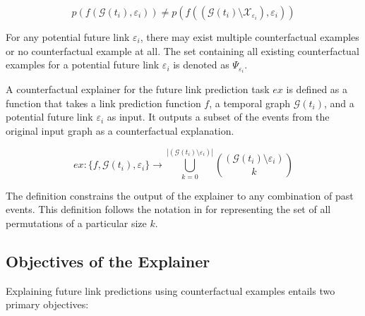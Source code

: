 \begin{equation}
    \label{e_CFExplanation}
    p(f(\mathcal{G}(t_i), \varepsilon_{i})) \neq p(f((\mathcal{G}(t_i) \setminus \mathcal{X}_{\varepsilon_i}), \varepsilon_{i}))
\end{equation}

For any potential future link $\varepsilon_{i}$, there may exist multiple counterfactual examples or no counterfactual example at all. The set containing all existing counterfactual examples for a potential future link $\varepsilon_{i}$ is denoted as $\Psi_{\varepsilon_i}$.

A counterfactual explainer for the future link prediction task $ex$ is defined as a function that takes a link prediction function $f$, a temporal graph $\mathcal{G}(t_i)$, and a potential future link $\varepsilon_i$ as input. It outputs a subset of the events from the original input graph as a counterfactual explanation.

\begin{equation}
    \label{e_Explainer}
    ex: \{f, \mathcal{G}(t_i), \varepsilon_i\} \rightarrow \bigcup_{k = 0}^{|(\mathcal{G}(t_i) \setminus \varepsilon_i)|} {(\mathcal{G}(t_i) \setminus \varepsilon_i) \choose k}
\end{equation}

The definition constrains the output of the explainer to any combination of past events. This definition follows the notation in \cite{stanley_enumerative_1986} for representing the set of all permutations of a particular size $k$.

\newpage

\subsection{Objectives of the Explainer}
\label{s_ProblemFormulation_Objectives}

Explaining future link predictions using counterfactual examples entails two primary objectives:

